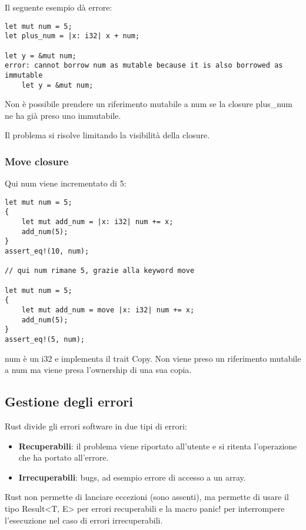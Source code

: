 Il seguente esempio dà errore:

\begin{lstlisting}
let mut num = 5;
let plus_num = |x: i32| x + num;

let y = &mut num;
error: cannot borrow num as mutable because it is also borrowed as immutable
    let y = &mut num;
\end{lstlisting}

Non è possibile prendere un riferimento mutabile a num se la closure plus\_num
ne ha già preso uno immutabile.

Il problema si risolve limitando la visibilità della closure.

\subsubsection{Move closure}

Qui num viene incrementato di 5:

\begin{lstlisting}
let mut num = 5;
{
    let mut add_num = |x: i32| num += x;
    add_num(5);
}
assert_eq!(10, num);

// qui num rimane 5, grazie alla keyword move

let mut num = 5;
{
    let mut add_num = move |x: i32| num += x;
    add_num(5);
}
assert_eq!(5, num);
\end{lstlisting}

num è un i32 e implementa il trait Copy.
Non viene preso un riferimento mutabile a num ma viene presa l'ownership di una
sua copia.

\subsection{Gestione degli errori}

Rust divide gli errori software in due tipi di errori:

\begin{itemize}
  \item \textbf{Recuperabili}: il problema viene riportato all'utente e si ritenta
l'operazione che ha portato all'errore.
  \item \textbf{Irrecuperabili}: bugs, ad esempio errore di accesso a un array.
\end{itemize}

Rust non permette di lanciare eccezioni (sono assenti), ma permette di usare il tipo
Result<T, E> per errori recuperabili e la macro panic! per interrompere l'esecuzione
nel caso di errori irrecuperabili.

